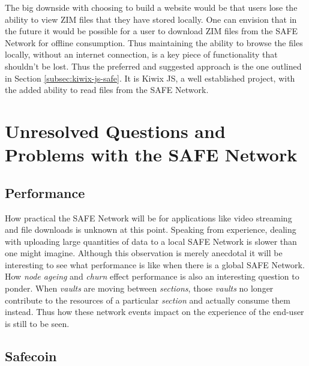 The big downside with choosing to build a website would be that users lose the ability to view ZIM files that they have stored locally. One can envision that in the future it would be possible for a user to download ZIM files from the SAFE Network for offline consumption. Thus maintaining the ability to browse the files locally, without an internet connection, is a key piece of functionality that shouldn't be lost. Thus the preferred and suggested approach is the one outlined in Section \ref{subsec:kiwix-js-safe}. It is Kiwix JS, a well established project, with the added ability to read files from the SAFE Network.

\section{Unresolved Questions and Problems with the SAFE Network}

\subsection{Performance}
\label{subsec:problem-performance}

How practical the SAFE Network will be for applications like video streaming and file downloads is unknown at this point. Speaking from experience, dealing with uploading large quantities of data to a local SAFE Network is slower than one might imagine. Although this observation is merely anecdotal it will be interesting to see what performance is like when there is a global SAFE Network. How \textit{node ageing} and \textit{churn} effect performance is also an interesting question to ponder. When \textit{vaults} are moving between \textit{sections}, those \textit{vaults} no longer contribute to the resources of a particular \textit{section} and actually consume them instead. Thus how these network events impact on the experience of the end-user is still to be seen.

\subsection{Safecoin}
\label{subsec:problem-safecoin}

